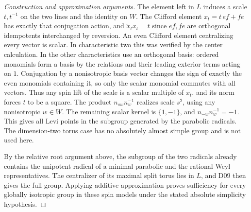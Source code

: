 \documentclass[11pt,a4paper,openany,oneside]{book}
\theoremstyle{resultstyle}
\theoremstyle{definition}
\numberwithin{equation}{chapter}
\begin{document}
\begin{proof}[Construction and approximation arguments]
The element left in \(L\) induces a scale \(t,t^{-1}\)
on the two lines and the identity on \(W\).
The Clifford element \(x_t=t\,ef+fe\) has exactly
that conjugation action, and \(\widetilde x_t x_t=t\)
since \(ef,fe\) are orthogonal idempotents interchanged
by reversion. An even Clifford element centralizing
every vector is scalar. In characteristic two this
was verified by the center calculation. In the other
characteristics use an orthogonal basis: ordered
monomials form a basis by the relations and their
leading exterior terms acting on \(1\).
Conjugation by a nonisotropic basis vector changes
the sign of exactly the even monomials containing it,
so only the scalar monomial commutes with all vectors.
Thus any spin lift of the scale is a
scalar multiple of \(x_t\), and its norm forces \(t\)
to be a square. The product \(n_{sw}n_w^{-1}\) realizes
scale \(s^2\), using any nonisotropic \(w\in W\).
The remaining scalar kernel is \(\{1,-1\}\), and
\(n_{-w}n_w^{-1}=-1\). This gives all Levi points in the
subgroup generated by the parabolic radicals. The
dimension-two torus case has no absolutely almost
simple group and is not used here.

By the relative root argument above, the subgroup
of the two radicals already contains the unipotent
radical of a minimal parabolic and the rational Weyl
representatives. The centralizer of its maximal split
torus lies in \(L\), and D09 then gives the full group.
Applying additive approximation proves sufficiency
for every globally isotropic group in these spin models
under the stated absolute simplicity hypothesis.


\end{proof}
\end{document}
